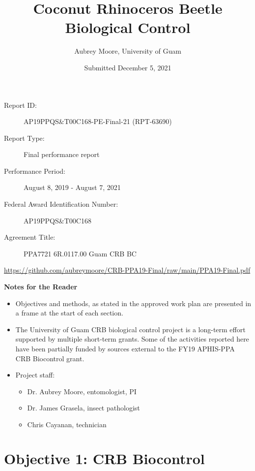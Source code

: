 \documentclass[12pt,letterpaper,english,bibliography=totocnumbered,abstract=on]{scrartcl}
\begin{document}
\titlehead{USDA-APHIS Final Report}
\title{Coconut Rhinoceros Beetle Biological Control}
\author{Aubrey Moore, University of Guam}
\date{Submitted December 5, 2021}
\maketitle
\begin{description}	
	\item[Report ID:] AP19PPQS\&T00C168-PE-Final-21 (RPT-63690)
	\item[Report Type:] Final performance report
	\item[Performance Period:] August 8, 2019 - August 7, 2021
	\item[Federal Award Identification Number:] AP19PPQS\&T00C168
	\item[Agreement Title:] PPA7721 6R.0117.00 Guam CRB BC
\end{description}

\begin{footnotesize}
\url{https://github.com/aubreymoore/CRB-PPA19-Final/raw/main/PPA19-Final.pdf}
\end{footnotesize}

\newpage{}
\tableofcontents{}

\listoftodos

\clearpage
\textbf{Notes for the Reader}
\begin{itemize}	
	\item Objectives and methods, as stated in the approved work plan \cite{mooreWorkPlanAPHISPPA2020} are presented in a frame at the start of each section. 	
	\item The University of Guam CRB biological control project is a long-term effort supported by multiple short-term grants. Some of the activities reported here have been partially funded by sources external to the FY19 APHIS-PPA CRB Biocontrol grant. 
	\item Project staff:
	\begin{itemize}
		\item Dr. Aubrey Moore, entomologist, PI
		\item Dr. James Grasela, insect pathologist
		\item Chris Cayanan, technician	
	\end{itemize}
\end{itemize}


\newpage

\section{Objective 1: CRB Biocontrol}
\end{document}
